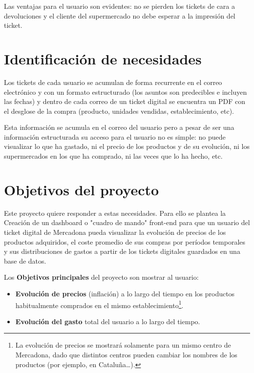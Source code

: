 \documentclass[a4paper,12pt]{report}
\begin{document}
		Las ventajas para el usuario son evidentes: no se pierden los tickets de cara a devoluciones y el cliente del supermercado no debe esperar a la impresión del ticket.
		
		
		
		\section{Identificación de necesidades}
		\label{section:identificacionNecesidades}
		
		Los tickets de cada usuario se acumulan de forma recurrente en el correo electrónico y con un formato estructurado (los asuntos son predecibles e incluyen las fechas) y dentro de cada correo de un ticket digital se encuentra un PDF con el desglose de la compra (producto, unidades vendidas, establecimiento, etc).
		
		Esta información se acumula en el correo del usuario pero a pesar de ser una información estructurada su acceso para el usuario no es simple: no puede visualizar lo que ha gastado, ni el precio de los productos y de su evolución, ni los supermercados en los que ha comprado, ni las veces que lo ha hecho, etc.

		\section{Objetivos del proyecto} %
		\label{section:objetivosProyecto}
		
		Este proyecto quiere responder a estas necesidades. Para ello se plantea la Creación de un dashboard o "cuadro de mando" front-end para que un usuario del ticket digital de Mercadona pueda visualizar la evolución de precios de los productos adquiridos, el coste promedio de sus compras por períodos temporales y sus distribuciones de gastos a partir de los tickets digitales guardados en una base de datos.
		
		
		Los \textbf{Objetivos principales} del proyecto son mostrar al usuario:

					
		\begin{itemize}
			\setlength{\itemsep}{-.5em}
			\item \textbf{Evolución de precios} (inflación) a lo largo del tiempo en los productos habitualmente comprados en el mismo establecimiento\footnote{La evolución de precios se mostrará solamente para un mismo centro de Mercadona, dado que distintos centros pueden cambiar los nombres de los productos (por ejemplo, en Cataluña…).}.
			\item \textbf{Evolución del gasto} total del usuario a lo largo del tiempo.
		\end{itemize}
		
\end{document}
